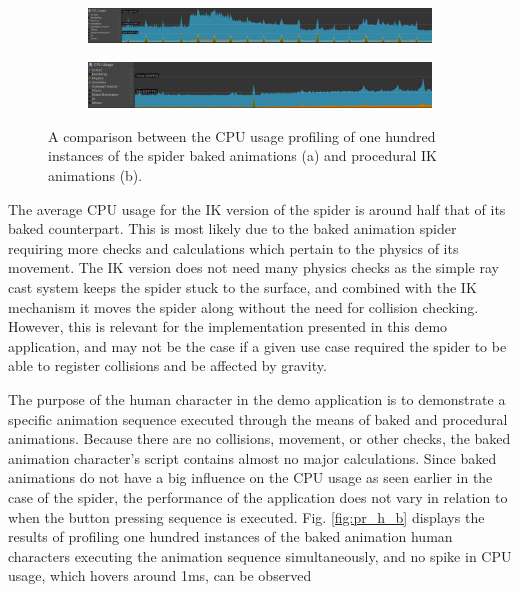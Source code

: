 \begin{figure}
    \centering
    \captionsetup{justification=centering}
    \begin{subfigure}{\textwidth}
        \centering
        \includegraphics[width=\linewidth]{grafika/pr_sp_b.eps}
        \subcaption{}
        \label{fig:pr_sp_b}
    \end{subfigure}
    \begin{subfigure}{\textwidth}
        \centering
        \includegraphics[width=\linewidth]{grafika/pr_sp_ik.eps}
        \subcaption{}
        \label{fig:pr_sp_ik}
    \end{subfigure}
    \caption{A comparison between the CPU usage profiling of one hundred
    instances of the spider baked animations (a) and procedural IK
    animations (b).}
    \label{fig:pr_sp}
\end{figure}

The average CPU usage for the IK version of the spider is around half that of its
baked counterpart. This is most likely due to the baked animation spider
requiring more checks and calculations which pertain to the physics of its
movement. The IK version does not need many physics checks as the simple ray
cast system keeps the spider stuck to the surface, and combined with the IK
mechanism it moves the spider along without the need for collision checking.
However, this is relevant for the implementation presented in this demo
application, and may not be the case if a given use case required the spider to
be able to register collisions and be affected by gravity.

The purpose of the human character in the demo application is to demonstrate
a specific animation sequence executed through the means of baked and procedural
animations. Because there are no collisions, movement, or other checks, the baked
animation character's script contains almost no major calculations. Since
baked animations do not have a big influence on the CPU usage as seen earlier in
the case of the spider, the performance of the application does not vary in
relation to when the button pressing sequence is executed. Fig.
\ref{fig:pr_h_b} displays the results of profiling one hundred instances of the
baked animation human characters executing the animation sequence
simultaneously, and no spike in CPU usage, which hovers around 1ms, can be
observed

